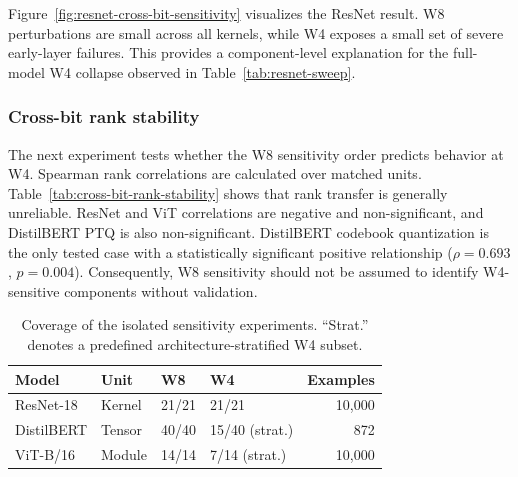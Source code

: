 \documentclass[conference]{IEEEtran}
\begin{document}
Figure~\ref{fig:resnet-cross-bit-sensitivity} visualizes the ResNet result. W8 perturbations are small across all kernels, while W4 exposes a small set of severe early-layer failures. This provides a component-level explanation for the full-model W4 collapse observed in Table~\ref{tab:resnet-sweep}.

\subsubsection{Cross-bit rank stability}

The next experiment tests whether the W8 sensitivity order predicts behavior at W4. Spearman rank correlations are calculated over matched units. Table~\ref{tab:cross-bit-rank-stability} shows that rank transfer is generally unreliable. ResNet and ViT correlations are negative and non-significant, and DistilBERT PTQ is also non-significant. DistilBERT codebook quantization is the only tested case with a statistically significant positive relationship ($\rho=0.693$, $p=0.004$). Consequently, W8 sensitivity should not be assumed to identify W4-sensitive components without validation.

\begin{table}[!t]
\centering
\caption{Coverage of the isolated sensitivity experiments. ``Strat.'' denotes a predefined architecture-stratified W4 subset.}
\label{tab:sensitivity-coverage}
\scriptsize
\setlength{\tabcolsep}{2.5pt}
\begin{tabular}{@{}llllr@{}}
\toprule
Model & Unit & W8 & W4 & Examples \\
\midrule
ResNet-18 & Kernel & 21/21 & 21/21 & 10,000 \\
DistilBERT & Tensor & 40/40 & 15/40 (strat.) & 872 \\
ViT-B/16 & Module & 14/14 & 7/14 (strat.) & 10,000 \\
\bottomrule
\end{tabular}
\end{table}
\end{document}

